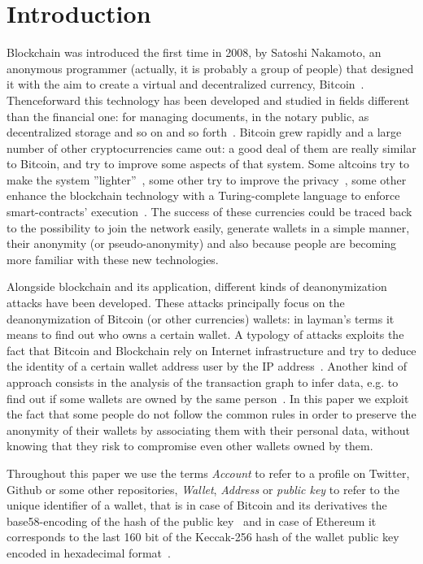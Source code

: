 \section{Introduction}
Blockchain was introduced the first time in 2008, by Satoshi Nakamoto, an
anonymous programmer (actually, it is probably a group of people) that
designed it with the aim to create a virtual and decentralized currency,
Bitcoin~\cite{bib:satoshi}.
Thenceforward this technology has been developed and
studied in fields different than the financial one: for managing documents, in
the notary public, as decentralized storage and so on and so
forth~\cite{bib:air}. Bitcoin grew
rapidly and a large number of other cryptocurrencies came out:
a good deal of them are really
similar to Bitcoin, and try to improve some aspects of that system. Some
altcoins try to make the system ''lighter''~\cite{bib:litecoin:wiki},
some other try to improve the privacy~\cite{bib:zerocoin:white_paper,
bib:zerocash:white_paper,
bib:monero:white_paper}, some other enhance the blockchain technology with a
Turing-complete language to enforce smart-contracts'
execution~\cite{bib:ethereum:whitepaper}.
The success of these
currencies could be traced back to the possibility to join the network easily,
generate wallets in a simple manner,
their anonymity (or pseudo-anonymity) and also because people are
becoming more familiar with these new technologies.


Alongside blockchain and its application, different kinds of deanonymization
attacks have been developed.
These attacks principally focus on the
deanonymization of Bitcoin (or other currencies) wallets: in layman's terms
it means to find out who owns a certain wallet.
A typology of attacks exploits the fact that Bitcoin and Blockchain rely
on Internet infrastructure and try to deduce the identity of a certain wallet
address user by the IP address~\cite{bib:deanon}.
Another kind of approach consists in the analysis of the transaction graph
to infer data, e.g. to find out if some wallets are owned by the same
person~\cite{bib:fistful}.
In this paper we exploit the fact that some people do not follow the common
rules in order to preserve the anonymity of their wallets by associating them
with their personal data, without knowing that they risk to compromise even
other wallets owned by them.

Throughout this paper we use the terms \emph{Account} to refer to a profile
on Twitter, Github or some other repositories,
\emph{Wallet}, \emph{Address} or \emph{public key} to refer 
to the unique identifier of a wallet, that is in case of Bitcoin and its
derivatives the base58-encoding of the hash of the public
key~\cite{bib:bitcoin:mastering} and in case of
Ethereum it corresponds to the last 160 bit of the Keccak-256 hash of the
wallet public key encoded in hexadecimal 
format~\cite{bib:ethereum:yellow:paper}.

